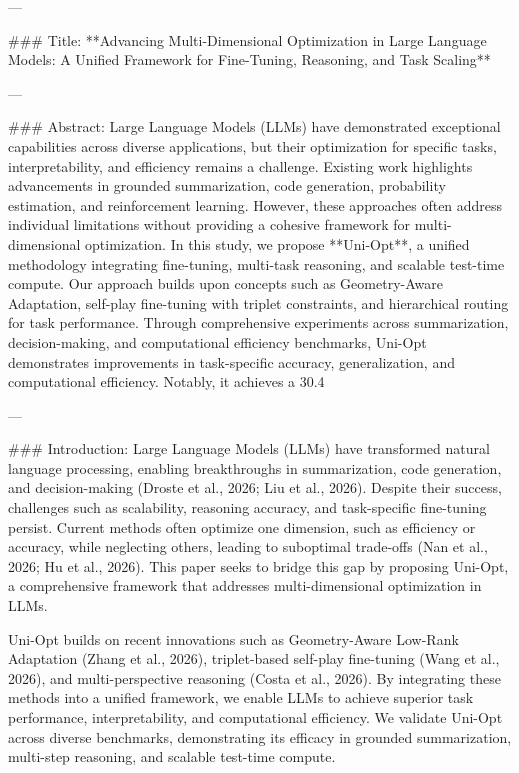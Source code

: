 ---

### Title:  
**Advancing Multi-Dimensional Optimization in Large Language Models: A Unified Framework for Fine-Tuning, Reasoning, and Task Scaling**

---

### Abstract:  
Large Language Models (LLMs) have demonstrated exceptional capabilities across diverse applications, but their optimization for specific tasks, interpretability, and efficiency remains a challenge. Existing work highlights advancements in grounded summarization, code generation, probability estimation, and reinforcement learning. However, these approaches often address individual limitations without providing a cohesive framework for multi-dimensional optimization. In this study, we propose **Uni-Opt**, a unified methodology integrating fine-tuning, multi-task reasoning, and scalable test-time compute. Our approach builds upon concepts such as Geometry-Aware Adaptation, self-play fine-tuning with triplet constraints, and hierarchical routing for task performance. Through comprehensive experiments across summarization, decision-making, and computational efficiency benchmarks, Uni-Opt demonstrates improvements in task-specific accuracy, generalization, and computational efficiency. Notably, it achieves a 30.4%

---

### Introduction:  
Large Language Models (LLMs) have transformed natural language processing, enabling breakthroughs in summarization, code generation, and decision-making (Droste et al., 2026; Liu et al., 2026). Despite their success, challenges such as scalability, reasoning accuracy, and task-specific fine-tuning persist. Current methods often optimize one dimension, such as efficiency or accuracy, while neglecting others, leading to suboptimal trade-offs (Nan et al., 2026; Hu et al., 2026). This paper seeks to bridge this gap by proposing Uni-Opt, a comprehensive framework that addresses multi-dimensional optimization in LLMs.

Uni-Opt builds on recent innovations such as Geometry-Aware Low-Rank Adaptation (Zhang et al., 2026), triplet-based self-play fine-tuning (Wang et al., 2026), and multi-perspective reasoning (Costa et al., 2026). By integrating these methods into a unified framework, we enable LLMs to achieve superior task performance, interpretability, and computational efficiency. We validate Uni-Opt across diverse benchmarks, demonstrating its efficacy in grounded summarization, multi-step reasoning, and scalable test-time compute.

